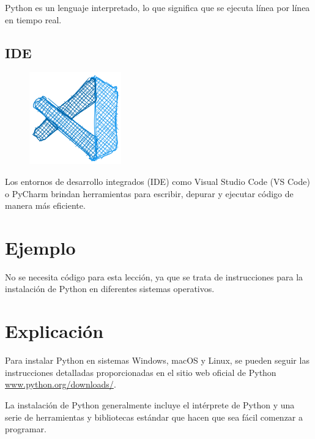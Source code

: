 \documentclass[
  a4paper,
  DIV=11,
  numbers=noendperiod,
  onepage,
  openany]{scrreprt}
\begin{document}
Python es un lenguaje interpretado, lo que significa que se ejecuta
línea por línea en tiempo real.

\subsection{IDE}\label{ide}

\begin{figure}

{\centering \includegraphics[width=1.5625in,height=\textheight]{unidades/unidad1/images/vscode.png}

}

\end{figure}

Los entornos de desarrollo integrados (IDE) como Visual Studio Code (VS
Code) o PyCharm brindan herramientas para escribir, depurar y ejecutar
código de manera más eficiente.

\section{Ejemplo}\label{ejemplo-1}

No se necesita código para esta lección, ya que se trata de
instrucciones para la instalación de Python en diferentes sistemas
operativos.

\section{Explicación}\label{explicaciuxf3n-1}

Para instalar Python en sistemas Windows, macOS y Linux, se pueden
seguir las instrucciones detalladas proporcionadas en el sitio web
oficial de Python
\href{https://www.python.org/downloads/}{www.python.org/downloads/}.

La instalación de Python generalmente incluye el intérprete de Python y
una serie de herramientas y bibliotecas estándar que hacen que sea fácil
comenzar a programar.
\end{document}
